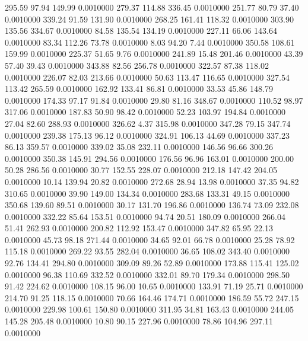  295.59   97.94  149.99   0.0010000
 279.37  114.88  336.45   0.0010000
 251.77   80.79   37.40   0.0010000
 339.24   91.59  131.90   0.0010000
 268.25  161.41  118.32   0.0010000
 303.90  135.56  334.67   0.0010000
  84.58  135.54  134.19   0.0010000
 227.11   66.06  143.64   0.0010000
  83.34  112.26   73.78   0.0010000
   8.03   94.20    7.44   0.0010000
 350.58  108.61  159.99   0.0010000
 225.37   51.65    9.76   0.0010000
 241.89   15.48  201.46   0.0010000
  43.39   57.40   39.43   0.0010000
 343.88   82.56  256.78   0.0010000
 322.57   87.38  118.02   0.0010000
 226.07   82.03  213.66   0.0010000
  50.63  113.47  116.65   0.0010000
 327.54  113.42  265.59   0.0010000
 162.92  133.41   86.81   0.0010000
  33.53   45.86  148.79   0.0010000
 174.33   97.17   91.84   0.0010000
  29.80   81.16  348.67   0.0010000
 110.52   98.97  317.06   0.0010000
 187.83   50.90   98.42   0.0010000
  52.23  103.97  194.84   0.0010000
  27.04   82.60  288.93   0.0010000
 326.62    4.37  315.98   0.0010000
 347.28   79.15  347.74   0.0010000
 239.38  175.13   96.12   0.0010000
 324.91  106.13   44.69   0.0010000
 337.23   86.13  359.57   0.0010000
 339.02   35.08  232.11   0.0010000
 146.56   96.66  300.26   0.0010000
 350.38  145.91  294.56   0.0010000
 176.56   96.96  163.01   0.0010000
 200.00   50.28  286.56   0.0010000
  30.77  152.55  228.07   0.0010000
 212.18  147.42  204.05   0.0010000
  10.14  139.94   20.82   0.0010000
 272.68   28.94   13.98   0.0010000
  37.35   94.82  310.65   0.0010000
  39.90  149.00  134.34   0.0010000
 283.68  133.31   49.15   0.0010000
 350.68  139.60   89.51   0.0010000
  30.17  131.70  196.86   0.0010000
 136.74   73.09  232.08   0.0010000
 332.22   85.64  153.51   0.0010000
  94.74   20.51  180.09   0.0010000
 266.04   51.41  262.93   0.0010000
 200.82  112.92  153.47   0.0010000
 347.82   65.95   22.13   0.0010000
  45.73   98.18  271.44   0.0010000
  34.65   92.01   66.78   0.0010000
  25.28   78.92  115.18   0.0010000
 269.22   93.55  282.04   0.0010000
  36.65  108.02  343.40   0.0010000
  92.76  134.41  294.80   0.0010000
 309.09   89.26   52.89   0.0010000
 173.88  115.41  125.02   0.0010000
  96.38  110.69  332.52   0.0010000
 332.01   89.70  179.34   0.0010000
 298.50   91.42  224.62   0.0010000
 108.15   96.00   10.65   0.0010000
 133.91   71.19   25.71   0.0010000
 214.70   91.25  118.15   0.0010000
  70.66  164.46  174.71   0.0010000
 186.59   55.72  247.15   0.0010000
 229.98  100.61  150.80   0.0010000
 311.95   34.81  163.43   0.0010000
 244.05  145.28  205.48   0.0010000
  10.80   90.15  227.96   0.0010000
  78.86  104.96  297.11   0.0010000
